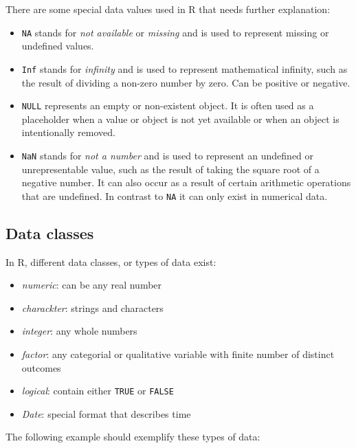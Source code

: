 \documentclass[
  12pt,
  oneside]{book}
\providecommand{\tightlist}{%
  \setlength{\itemsep}{0pt}\setlength{\parskip}{0pt}}
\theoremstyle{definition}
\theoremstyle{definition}
\theoremstyle{definition}
\theoremstyle{definition}
\theoremstyle{remark}
\begin{document}
There are some special data values used in R that needs further explanation:

\begin{itemize}
\tightlist
\item
  \texttt{NA} stands for \emph{not available} or \emph{missing} and is used to represent missing or undefined values.
\item
  \texttt{Inf} stands for \emph{infinity} and is used to represent mathematical infinity, such as the result of dividing a non-zero number by zero. Can be positive or negative.\\
\item
  \texttt{NULL} represents an empty or non-existent object. It is often used as a placeholder when a value or object is not yet available or when an object is intentionally removed.
\item
  \texttt{NaN} stands for \emph{not a number} and is used to represent an undefined or unrepresentable value, such as the result of taking the square root of a negative number. It can also occur as a result of certain arithmetic operations that are undefined. In contrast to \texttt{NA} it can only exist in numerical data.
\end{itemize}

\hypertarget{data-classes}{%
\subsection{Data classes}\label{data-classes}}

In R, different data classes, or types of data exist:

\begin{itemize}
\tightlist
\item
  \emph{numeric}: can be any real number
\item
  \emph{charackter}: strings and characters
\item
  \emph{integer}: any whole numbers
\item
  \emph{factor}: any categorial or qualitative variable with finite number of distinct outcomes
\item
  \emph{logical}: contain either \texttt{TRUE} or \texttt{FALSE}
\item
  \emph{Date}: special format that describes time
\end{itemize}

The following example should exemplify these types of data:
\end{document}

